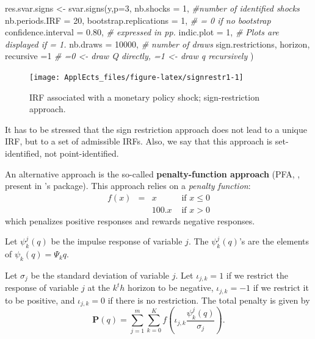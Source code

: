 \documentclass[
  12pt,
]{book}
\newenvironment{Shaded}{\begin{snugshade}}{\end{snugshade}}
\newcommand{\AttributeTok}[1]{\textcolor[rgb]{0.77,0.63,0.00}{#1}}
\newcommand{\CommentTok}[1]{\textcolor[rgb]{0.56,0.35,0.01}{\textit{#1}}}
\newcommand{\DecValTok}[1]{\textcolor[rgb]{0.00,0.00,0.81}{#1}}
\newcommand{\FloatTok}[1]{\textcolor[rgb]{0.00,0.00,0.81}{#1}}
\newcommand{\FunctionTok}[1]{\textcolor[rgb]{0.00,0.00,0.00}{#1}}
\newcommand{\NormalTok}[1]{#1}
\newcommand{\OtherTok}[1]{\textcolor[rgb]{0.56,0.35,0.01}{#1}}
\theoremstyle{definition}
\theoremstyle{definition}
\theoremstyle{definition}
\theoremstyle{definition}
\theoremstyle{remark}
\begin{document}
\begin{Shaded}
\begin{Highlighting}[]
\NormalTok{res.svar.signs }\OtherTok{\textless{}{-}} 
  \FunctionTok{svar.signs}\NormalTok{(y,}\AttributeTok{p=}\DecValTok{3}\NormalTok{,}
             \AttributeTok{nb.shocks =} \DecValTok{1}\NormalTok{, }\CommentTok{\#number of identified shocks}
             \AttributeTok{nb.periods.IRF =} \DecValTok{20}\NormalTok{,}
             \AttributeTok{bootstrap.replications =} \DecValTok{1}\NormalTok{, }\CommentTok{\# = 0 if no bootstrap}
             \AttributeTok{confidence.interval =} \FloatTok{0.80}\NormalTok{, }\CommentTok{\# expressed in pp.}
             \AttributeTok{indic.plot =} \DecValTok{1}\NormalTok{, }\CommentTok{\# Plots are displayed if = 1.}
             \AttributeTok{nb.draws =} \DecValTok{10000}\NormalTok{, }\CommentTok{\# number of draws}
\NormalTok{             sign.restrictions,}
\NormalTok{             horizon,}
             \AttributeTok{recursive =}\DecValTok{1} \CommentTok{\#  =0 \textless{}{-} draw Q directly, =1 \textless{}{-} draw q recursively}
\NormalTok{  )}
\end{Highlighting}
\end{Shaded}

\begin{figure}
\texttt{[image: ApplEcts\_files/figure-latex/signrestr1-1]} \caption{IRF associated with a monetary policy shock; sign-restriction approach.}\label{fig:signrestr1}
\end{figure}

It has to be stressed that the sign restriction approach does not lead to a unique IRF, but to a set of admissible IRFs. Also, we say that this approach is set-identified, not point-identified.

An alternative approach is the so-called \textbf{penalty-function approach} (PFA, \citet{Uhlig_2005}, present in \citet{Danne_2015}'s package). This approach relies on a \emph{penalty function}:
\[
\begin{array}{llll}f(x)&=&x&\text{ if }x\le0\\
&&100.x&\text{ if }x>0\end{array}
\]
which penalizes positive responses and rewards negative responses.

Let \(\psi_k^j(q)\) be the impulse response of variable \(j\). The \(\psi_k^j(q)\)'s are the elements of \(\psi_k(q)=\Psi_kq\).

Let \(\sigma_j\) be the standard deviation of variable \(j\). Let \(\iota_{j,k}=1\) if we restrict the response of variable \(j\) at the \(k^th\) horizon to be negative, \(\iota_{j,k}=-1\) if we restrict it to be positive, and \(\iota_{j,k}=0\) if there is no restriction. The total penalty is given by \[
\mathbf{P}(q)=\sum_{j=1}^m\sum_{k=0}^Kf\left(\iota_{j,k}\frac{\psi_k^j(q)}{\sigma_j}\right).
\]
\end{document}
